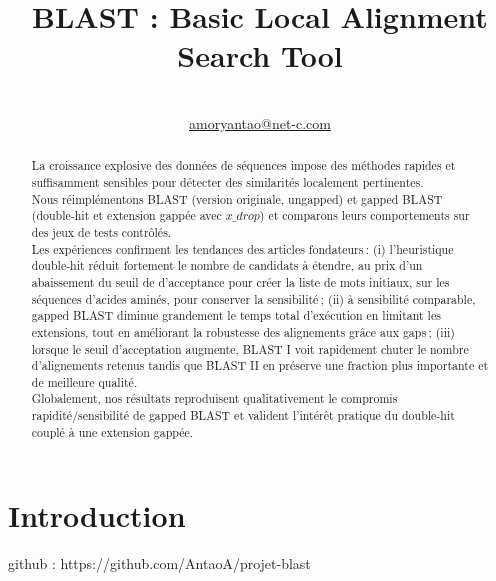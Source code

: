 \documentclass[conference]{IEEEtran}
\begin{document}
\title{BLAST : Basic Local Alignment Search Tool}

\author{
\\
\href{mailto:amoryantao@net-c.com}{amoryantao@net-c.com}}

\maketitle

\begin{abstract}
La croissance explosive des données de séquences impose des méthodes rapides et suffisamment sensibles pour détecter des similarités localement pertinentes.\\
Nous réimplémentons BLAST (version originale, ungapped) et gapped BLAST (double-hit et extension gappée avec $x\_drop$) et comparons leurs comportements sur des jeux de tests contrôlés.\\
Les expériences confirment les tendances des articles fondateurs : (i) l’heuristique double-hit réduit fortement le nombre de candidats à étendre, au prix d’un abaissement du seuil de d'acceptance pour créer la liste de mots initiaux, sur les séquences d'acides aminés,  pour conserver la sensibilité ; (ii) à sensibilité comparable, gapped BLAST diminue grandement le temps total d’exécution en limitant les extensions, tout en améliorant la robustesse des alignements grâce aux gaps ; (iii) lorsque le seuil d’acceptation augmente, BLAST I voit rapidement chuter le nombre d’alignements retenus tandis que BLAST II en préserve une fraction plus importante et de meilleure qualité.\\
Globalement, nos résultats reproduisent qualitativement le compromis rapidité/sensibilité de gapped BLAST et valident l’intérêt pratique du double-hit couplé à une extension gappée.
\end{abstract}


\section{Introduction}
github : https://github.com/AntaoA/projet-blast
\end{document}
